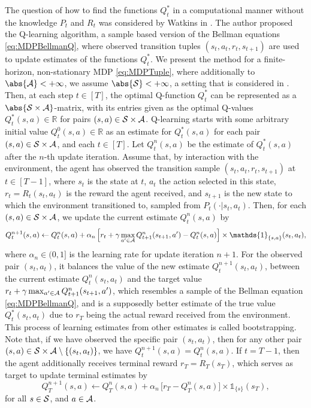 \documentclass[
    a4paper,
    11pt,
    bibliography=totoc,
    listof=totoc,      
    headinclude=true,
    cleardoublepage=empty,
]{scrbook}
\theoremstyle{plain}
\theoremstyle{definition}
\theoremstyle{remark}
\newcommand{\SetR}{\mathbb R}
\newcommand{\SpaceS}{{\cal S}}
\newcommand{\SpaceA}{{\cal A}}
\begin{document}
The question of how to find the functions $Q_t^*$ in a computational manner 
without the knowledge $P_t$ and $R_t$ was considered by Watkins in 
\cite{watkins1989_lfdr}. The author proposed the Q-learning algorithm, a 
sample based version of the Bellman equations \eqref{eq:MDPBellmanQ}, where 
observed transition tuples $(s_t, a_t, r_t, s_{t+1})$ are used to update 
estimates of the functions $Q^*_t$. We present the method for a 
finite-horizon, non-stationary MDP \eqref{eq:MDPTuple}, where additionally to $
\abs{\SpaceA}<+\infty$, we assume $\abs{\SpaceS}<+\infty$, a setting that is 
considered in \cite{vp2024_eemsgwfhq}. Then, at each step $t\in[T]$, the 
optimal Q-function $Q^*_t$ can be represented as a $\abs{\SpaceS \times 
\SpaceA}$-matrix, with its entries given as the optimal Q-values
$Q^*_t(s,a)\in\SetR$ for pairs $(s,a)\in\SpaceS\times\SpaceA$. Q-learning 
starts with some arbitrary initial value $Q^0_t(s,a)\in\SetR$ as an estimate 
for $Q^*_t(s,a)$ for each pair $(s,a) \in \SpaceS \times \SpaceA$, and each 
$t\in[T]$. Let $Q^n_t(s,a)$ be the estimate of $Q_t^*(s,a)$ after the $n$-th 
update iteration.
Assume that, by interaction with the environment, the agent has observed the 
transition sample $(s_t,a_t,r_t,s_{t+1})$ at $t\in[T-1]$, where $s_t$ is the 
state at $t$, $a_t$ the action selected in this state, $r_t=R_t(s_t,a_t)$ is 
the reward the agent received, and $s_{t+1}$ is the new state to which the 
environment transitioned to, sampled from $P_t(\cdot|s_t,a_t)$. Then, for each 
$(s,a)\in\SpaceS\times\SpaceA$, we update the current estimate $Q^n_t(s,a)$ by
\begin{equation}
\label{eq:MDPQUpdate}
    Q^{n+1}_t(s,a) 
    \gets Q^n_t(s,a) + \alpha_{n}\, \Bigl[
        r_t + \gamma \max_{a'\in\SpaceA} Q^{n}_{t+1}(s_{t+1},a') - Q^n_t(s,a)
    \Bigr] \times \mathds{1}_{\{s,a\}}(s_t,a_t),
\end{equation}
where $\alpha_n \in (0,1]$ is the learning rate for update iteration $n+1$. 
For the observed pair $(s_t, a_t)$, it balances the value of the new estimate 
$Q^{n+1}_t(s_t,a_t)$, between the current estimate $Q^n_t(s_t,a_t)$ and the 
target value $r_t + \gamma \max_{a'\in\SpaceA} Q^{n}_{t+1}(s_{t+1},a')$, which 
resembles a sample of the Bellman equation \eqref{eq:MDPBellmanQ}, and is a
supposedly better estimate of the true value $Q^*_t(s_t,a_t)$ due to $r_T$ 
being the actual reward received from the environment. This process of 
learning estimates from other estimates is called bootstrapping. Note that, if 
we have observed the specific pair $(s_t,a_t)$, then for any other pair 
$(s,a)\in\SpaceS\times\SpaceA\setminus\{(s_t,a_t)\}$, we have $Q^{n+1}_t(s,a) 
= Q^{n}_t(s,a)$. If $t=T-1$, then the agent additionally receives terminal 
reward $r_T = R_T(s_T)$, which serves as target to update terminal estimates by
\begin{equation}
\label{eq:MDPQUpdateTerminal}
    Q^{n+1}_T(s,a) 
    \gets Q^n_T(s,a) + \alpha_n\, \bigl[
        r_T - Q^n_T(s,a)\bigr] \times \mathds{1}_{\{s\}}(s_T),
\end{equation}
for all $s\in\SpaceS$, and $a\in\SpaceA$.
\end{document}
